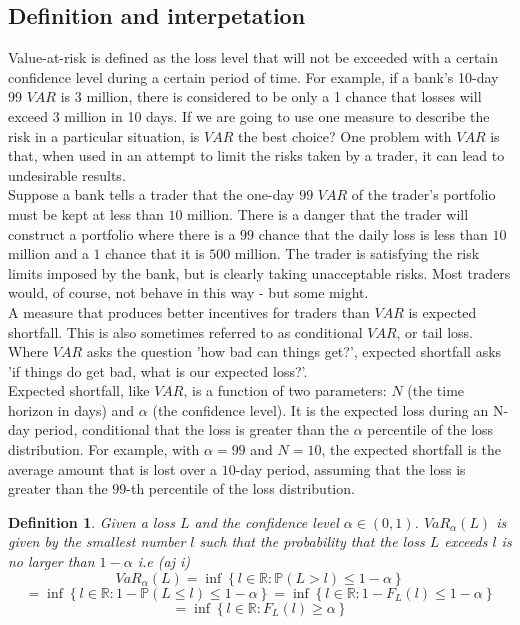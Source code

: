 \documentclass{book}
\newtheorem{definition}{Definition}[section]
\begin{document}
\subsection{Definition and interpetation}
Value-at-risk is defined as the loss level that will not be exceeded with a certain confidence level during a certain period of time. For example, if a bank's 10-day 99 $VAR$ is 3 million, there is considered to be only a 1 chance that losses will exceed 3 million in 10 days. If we are going to use one measure to describe the risk in a particular situation, is $VAR$ the best choice? One problem with $VAR$ is that, when used in an attempt to limit the risks taken by a trader, it can lead to undesirable results.\\
Suppose a bank tells a trader that the one-day $99$ $VAR$ of the trader's portfolio must be kept at less than $10$ million. There is a danger that the trader will construct a portfolio where there is a $99$ chance that the daily loss is less than $10$ million and a $1$ chance that it is $500$ million. The trader is satisfying the risk limits imposed by the bank, but is clearly taking unacceptable risks. Most traders would, of course, not behave in this way - but some might.\\
A measure that produces better incentives for traders than $VAR$ is expected shortfall. This is also sometimes referred to as conditional $VAR$, or tail loss. Where $VAR$ asks the question 'how bad can things get?', expected shortfall asks 'if things do get bad, what is our expected loss?'.\\
Expected shortfall, like $VAR$, is a function of two parameters: $N$ (the time horizon in days) and $\alpha$ (the confidence level). It is the expected loss during an N-day period, conditional that the loss is greater than the $\alpha$ percentile of the loss distribution. For example, with $\alpha = 99$ and $N = 10$, the expected shortfall is the average amount that is lost over a $10$-day period, assuming that the loss is greater than the $99$-th percentile of the loss distribution.\\
\begin{definition}
Given a loss $L$ and the confidence level $\alpha\in(0,1)$. $VaR_{\alpha}(L)$ is given by the smallest number $l$ such that the probability that the loss $L$ exceeds $l$ is no larger than $1-\alpha$ i.e (aj i)
$$
VaR_{\alpha}(L)=\inf\left\{l\in\mathbb{R}:\mathbb{P}(L>l)\leq 1-\alpha\right\}
$$ 
$$
=\inf\left\{l\in\mathbb{R}:1-\mathbb{P}(L\leq l)\leq 1-\alpha\right\}=\inf\left\{l\in\mathbb{R}:1-F_{L}(l)\leq 1-\alpha\right\}
$$
$$
=\inf\left\{l\in\mathbb{R}:F_{L}(l)\geq \alpha\right\}
$$
\end{definition}
\end{document}
